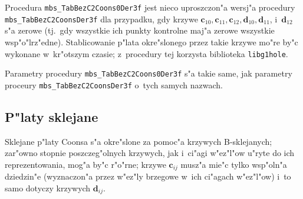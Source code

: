 \vspace{\bigskipamount}
\begin{sloppypar}
Procedura \texttt{mbs\_TabBezC2Coons0Der3f} jest nieco uproszczon"a wersj"a
procedury \texttt{mbs\_TabBezC2CoonsDer3f} dla przypadku, gdy krzywe
$\bm{c}_{10},\bm{c}_{11},\bm{c}_{12},\bm{d}_{10},\bm{d}_{11}$, i~$\bm{d}_{12}$
s"a zerowe (tj.\ gdy wszystkie ich punkty kontrolne maj"a zerowe wszystkie
wsp"o"lrz"edne). Stablicowanie p"lata okre"slonego przez takie krzywe mo"re
by"c wykonane w~kr"otszym czasie; z~procedury tej korzysta biblioteka
\texttt{libg1hole}.%
\end{sloppypar}

Parametry procedury \texttt{mbs\_TabBezC2Coons0Der3f} s"a takie same,   
jak parametry proceury \texttt{mbs\_TabBezC2CoonsDer3f} o~tych samych
nazwach.


\newpage
\subsection{P"laty sklejane}

Sklejane p"laty Coonsa s"a okre"slone za pomoc"a krzywych B-sklejanych;
zar"owno stopnie poszczeg"olnych krzywych, jak i~ci"agi w"ez"l"ow u"ryte do
ich reprezentowania, mog"a by"c r"o"rne; krzywe $\bm{c}_{ij}$ musz"a mie"c
tylko wsp"oln"a dziedzin"e (wyznaczon"a przez w"ez"ly brzegowe w~ich
ci"agach w"ez"l"ow) i~to samo dotyczy krzywych $\bm{d}_{ij}$.

